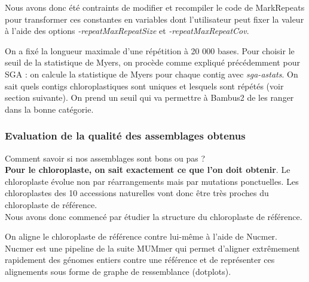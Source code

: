\documentclass[a4paper]{article}
\begin{document}
Nous avons donc été contraints de modifier et recompiler le code de MarkRepeats pour transformer ces constantes en variables dont l'utilisateur peut fixer la valeur à l'aide des options \textit{-repeatMaxRepeatSize} et \textit{-repeatMaxRepeatCov}. 

On a fixé la longueur maximale d'une répétition à 20 000 bases. Pour choisir le seuil de la statistique de Myers, on procède comme expliqué précédemment pour SGA : on calcule la statistique de Myers pour chaque contig avec \textit{sga-astats}. On sait quels contigs chloroplastiques sont uniques et lesquels sont répétés (voir section suivante). On prend un seuil qui va permettre à Bambus2 de les ranger dans la bonne catégorie. 

\subsubsection{Evaluation de la qualité des assemblages obtenus}

\vspace{0.2cm}

Comment savoir si nos assemblages sont bons ou pas ? \\

\textbf{Pour le chloroplaste, on sait exactement ce que l'on doit obtenir}. Le chloroplaste évolue non par réarrangements mais par mutations ponctuelles. Les chloroplastes des 10 accessions naturelles vont donc être très proches du chloroplaste de référence. \\

Nous avons donc commencé par étudier la structure du chloroplaste de référence. 

On aligne le chloroplaste de référence contre lui-même à l'aide de Nucmer. Nucmer est une pipeline de la suite MUMmer qui permet d'aligner extrêmement rapidement des génomes entiers contre une référence et de représenter ces alignements sous forme de graphe de ressemblance (dotplots).  
\end{document}
